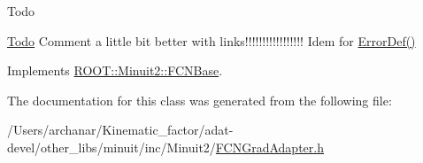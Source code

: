 \begin{DoxyRefDesc}{Todo}
\item[\mbox{\hyperlink{todo__todo000001}{Todo}}]Comment a little bit better with links!!!!!!!!!!!!!!!!! Idem for \mbox{\hyperlink{classROOT_1_1Minuit2_1_1FCNBase_ac4592475c58a65b037ba97ab5f3cba10}{Error\+Def()}}\end{DoxyRefDesc}


Implements \mbox{\hyperlink{classROOT_1_1Minuit2_1_1FCNBase_a04ef08ddad92ce8d89d498efbe021c39}{R\+O\+O\+T\+::\+Minuit2\+::\+F\+C\+N\+Base}}.



The documentation for this class was generated from the following file\+:\begin{DoxyCompactItemize}
\item 
/\+Users/archanar/\+Kinematic\+\_\+factor/adat-\/devel/other\+\_\+libs/minuit/inc/\+Minuit2/\mbox{\hyperlink{adat-devel_2other__libs_2minuit_2inc_2Minuit2_2FCNGradAdapter_8h}{F\+C\+N\+Grad\+Adapter.\+h}}\end{DoxyCompactItemize}
